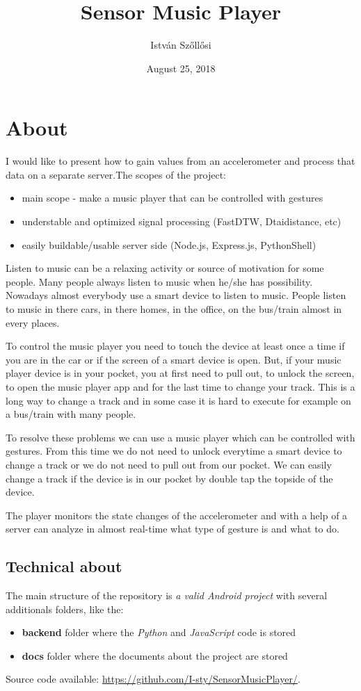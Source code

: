 \documentclass[12pt, a4paper, portrait]{article}
\title{\textbf{Sensor Music Player}}
\author{István Szőllősi}
\affil{Faculty of Sciences and Letters, ``Petru Maior'' University of Târgu Mureș}
\date{August 25, 2018}
\begin{document}
\maketitle
\newpage

\tableofcontents
\newpage

\section{About}
I would like to present how to gain values from an accelerometer and process that data on a separate server.\newline The scopes of the project:
\begin{itemize}
\item{main scope - make a music player that can be controlled with gestures}
\item{understable and optimized signal processing (FastDTW, Dtaidistance, etc)}
\item{easily buildable/usable server side (Node.js, Express.js, PythonShell)}
\end{itemize}
\par Listen to music can be a relaxing activity or source of motivation for some people. Many people always listen to music when he/she has possibility.
Nowadays almost everybody use a smart device to listen to music.
People listen to music in there cars, in there homes, in the office, on the bus/train almost in every places.
\par To control the music player you need to touch the device at least once a time if you are in the car or if the screen of a smart device is open.
But, if your music player device is in your pocket, you at first need to pull out, to unlock the screen, to open the music player app and for the last time to change your track.
This is a long way to change a track and in some case it is hard to execute for example on a bus/train with many people.
\par To resolve these problems we can use a music player which can be controlled with gestures. From this time we do not need to unlock everytime a smart device to change a track or we do not need to pull out from our pocket.
We can easily change a track if the device is in our pocket by double tap the topside of the device.
\par The player monitors the state changes of the accelerometer and with a help of a server can analyze in almost real-time what type of gesture is and what to do.
\subsection{Technical about}
\par The main structure of the repository is
\textit{a valid Android project} with several additionals folders, like the:
\begin{itemize}
\item{\textbf{backend}} folder where the \textit{Python} and \textit{JavaScript} code is stored
\item{\textbf{docs}} folder where the documents about the project are stored
\end{itemize}
\par Source code available: \url{https://github.com/I-sty/SensorMusicPlayer/}.
\end{document}
